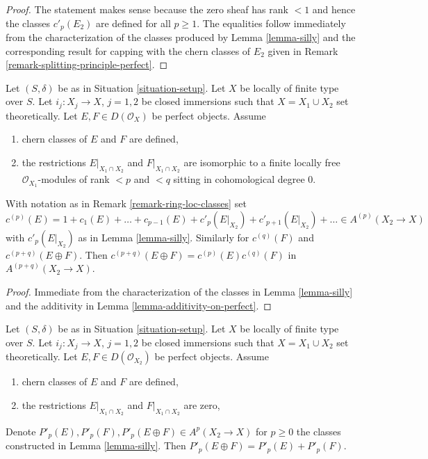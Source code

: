 \begin{proof}
The statement makes sense because the zero sheaf has rank $< 1$ and
hence the classes $c'_p(E_2)$ are defined for all $p \geq 1$. The equalities
follow immediately from the characterization of the classes produced
by Lemma \ref{lemma-silly} and the corresponding result for
capping with the chern classes of $E_2$ given in
Remark \ref{remark-splitting-principle-perfect}.
\end{proof}

\begin{lemma}
\label{lemma-silly-sum-c}
Let $(S, \delta)$ be as in Situation \ref{situation-setup}. Let $X$ be
locally of finite type over $S$. Let $i_j : X_j \to X$, $j = 1, 2$
be closed immersions such that $X = X_1 \cup X_2$ set theoretically. Let
$E, F \in D(\mathcal{O}_X)$ be perfect objects. Assume
\begin{enumerate}
\item chern classes of $E$ and $F$ are defined,
\item the restrictions $E|_{X_1 \cap X_2}$ and $F|_{X_1 \cap X_2}$
are isomorphic to a finite locally free $\mathcal{O}_{X_1}$-modules
of rank $< p$ and $< q$ sitting in cohomological degree $0$.
\end{enumerate}
With notation as in Remark \ref{remark-ring-loc-classes} set
$$
c^{(p)}(E) = 1 + c_1(E) + \ldots + c_{p - 1}(E) +
c'_p(E|_{X_2}) + c'_{p + 1}(E|_{X_2}) + \ldots \in A^{(p)}(X_2 \to X)
$$
with $c'_p(E|_{X_2})$ as in Lemma \ref{lemma-silly}. Similarly
for $c^{(q)}(F)$ and $c^{(p + q)}(E \oplus F)$.
Then $c^{(p + q)}(E \oplus F) = c^{(p)}(E)c^{(q)}(F)$
in $A^{(p + q)}(X_2 \to X)$.
\end{lemma}

\begin{proof}
Immediate from the characterization of the classes in
Lemma \ref{lemma-silly} and the additivity in
Lemma \ref{lemma-additivity-on-perfect}.
\end{proof}

\begin{lemma}
\label{lemma-silly-sum-P}
Let $(S, \delta)$ be as in Situation \ref{situation-setup}. Let $X$ be
locally of finite type over $S$. Let $i_j : X_j \to X$, $j = 1, 2$
be closed immersions such that $X = X_1 \cup X_2$ set theoretically. Let
$E, F \in D(\mathcal{O}_{X_2})$ be perfect objects. Assume
\begin{enumerate}
\item chern classes of $E$ and $F$ are defined,
\item the restrictions $E|_{X_1 \cap X_2}$ and $F|_{X_1 \cap X_2}$ are zero,
\end{enumerate}
Denote $P'_p(E), P'_p(F), P'_p(E \oplus F) \in A^p(X_2 \to X)$ for $p \geq 0$
the classes constructed in Lemma \ref{lemma-silly}. Then
$P'_p(E \oplus F) = P'_p(E) + P'_p(F)$.
\end{lemma}

